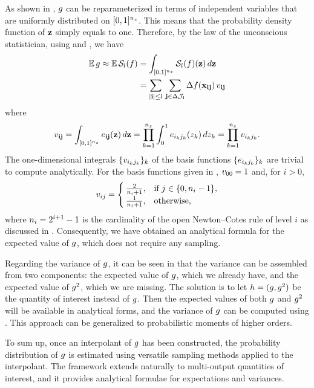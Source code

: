 As shown in , $g$ can be reparameterized in terms of
independent variables that are uniformly distributed on $[0, 1]^{n_z}$. This means
that the probability density function of $\mathbf{z}$ simply equals to one. Therefore,
by the law of the unconscious statistician, using  and
, we have
\begin{align*}
  \mathbb{E} \, g \approx \mathbb{E} \, \mathcal{S}_{l}(f) &= \int_{[0, 1]^{n_z}} \mathcal{S}_{l}(f)(\mathbf{z}) \, d\mathbf{z} \\
  &= \sum_{|\mathbf{i}| \leq l} \, \sum_{\mathbf{j} \in \Delta\mathcal{J}_{\mathbf{i}}} \Delta f(\mathbf{x}_{\mathbf{i}\mathbf{j}}) \, v_{\mathbf{i}\mathbf{j}}
\end{align*}
where
\[
  v_{\mathbf{i}\mathbf{j}} = \int_{[0, 1]^{n_z}} e_{\mathbf{i}\mathbf{j}}(\mathbf{z}) \, d\mathbf{z} = \prod_{k = 1}^{{n_z}} \int_0^1 e_{i_k j_k}(z_k) \, dz_k = \prod_{k = 1}^{{n_z}} v_{i_k j_k}.
\]
The one-dimensional integrals $\{ v_{i_k j_k} \}_k$ of the basis functions $\{
  e_{i_k j_k} \}_k$ are trivial to compute analytically. For the basis
functions given in , $v_{00} = 1$ and, for $i > 0$,
\[
  v_{ij} = \begin{cases}
    \frac{2}{n_i + 1}, & \text{if } j \in \{ 0, n_i - 1 \}, \\
    \frac{1}{n_i + 1}, & \text{otherwise},
  \end{cases}
\]
where $n_i = 2^{i + 1} - 1$ is the cardinality of the open Newton--Cotes rule
of level $i$ as discussed in . Consequently, we have
obtained an analytical formula for the expected value of $g$, which does not
require any sampling.

Regarding the variance of $g$, it can be seen in  that the
variance can be assembled from two components: the expected value of $g$, which
we already have, and the expected value of $g^2$, which we are missing. The
solution is to let $h = (g, g^2)$ be the quantity of interest instead of $g$.
Then the expected values of both $g$ and $g^2$ will be available in analytical
forms, and the variance of $g$ can be computed using . This
approach can be generalized to probabilistic moments of higher orders.

To sum up, once an interpolant of $g$ has been constructed, the probability
distribution of $g$ is estimated using versatile sampling methods applied to
the interpolant. The framework extends naturally to multi-output quantities of
interest, and it provides analytical formulae for expectations and variances.
